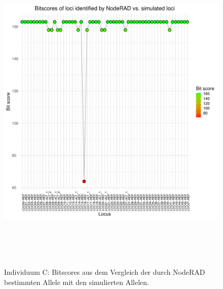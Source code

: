 \begin{figure}[H]
	\begin{center}
		\includegraphics[height=16cm]{bilder/evaluation/bitscores/C.plot_bitscores.pdf}
		\caption{Individuum C: Bitscores aus dem Vergleich der durch NodeRAD bestimmten Allele mit den simulierten Allelen.}
	\end{center}
\end{figure}
